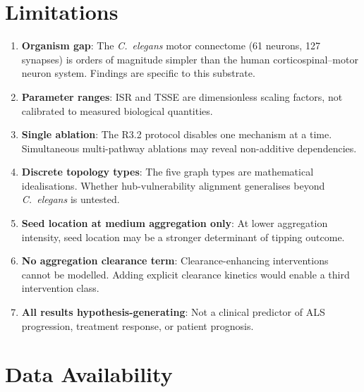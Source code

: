 \documentclass[12pt,a4paper]{article}
\begin{document}
\section{Limitations}

\begin{enumerate}
\item \textbf{Organism gap}: The \textit{C.~elegans} motor connectome (61 neurons, 127
      synapses) is orders of magnitude simpler than the human corticospinal--motor neuron
      system. Findings are specific to this substrate.

\item \textbf{Parameter ranges}: ISR and TSSE are dimensionless scaling factors, not
      calibrated to measured biological quantities.

\item \textbf{Single ablation}: The R3.2 protocol disables one mechanism at a time. Simultaneous
      multi-pathway ablations may reveal non-additive dependencies.

\item \textbf{Discrete topology types}: The five graph types are mathematical idealisations.
      Whether hub-vulnerability alignment generalises beyond \textit{C.~elegans} is untested.

\item \textbf{Seed location at medium aggregation only}: At lower aggregation intensity, seed
      location may be a stronger determinant of tipping outcome.

\item \textbf{No aggregation clearance term}: Clearance-enhancing interventions cannot be
      modelled. Adding explicit clearance kinetics would enable a third intervention class.

\item \textbf{All results hypothesis-generating}: Not a clinical predictor of ALS progression,
      treatment response, or patient prognosis.
\end{enumerate}

\section*{Data Availability}
\end{document}
